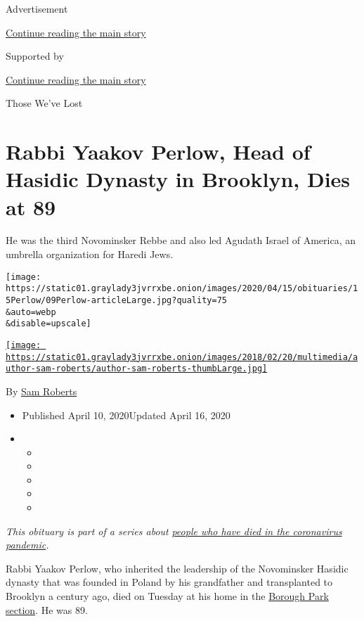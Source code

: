 Advertisement

\protect\hyperlink{after-top}{Continue reading the main story}

Supported by

\protect\hyperlink{after-sponsor}{Continue reading the main story}

Those We've Lost

\hypertarget{rabbi-yaakov-perlow-head-of-hasidic-dynasty-in-brooklyn-dies-at-89}{%
\section{Rabbi Yaakov Perlow, Head of Hasidic Dynasty in Brooklyn, Dies
at
89}\label{rabbi-yaakov-perlow-head-of-hasidic-dynasty-in-brooklyn-dies-at-89}}

He was the third Novominsker Rebbe and also led Agudath Israel of
America, an umbrella organization for Haredi Jews.

\texttt{[image: https://static01.graylady3jvrrxbe.onion/images/2020/04/15/obituaries/15Perlow/09Perlow-articleLarge.jpg?quality=75\\\&auto=webp\\\&disable=upscale]}

\href{https://www.nytimes3xbfgragh.onion/by/sam-roberts}{\texttt{[image: https://static01.graylady3jvrrxbe.onion/images/2018/02/20/multimedia/author-sam-roberts/author-sam-roberts-thumbLarge.jpg]}}

By \href{https://www.nytimes3xbfgragh.onion/by/sam-roberts}{Sam Roberts}

\begin{itemize}
\item
  Published April 10, 2020Updated April 16, 2020
\item
  \begin{itemize}
  \item
  \item
  \item
  \item
  \item
  \end{itemize}
\end{itemize}

\emph{This obituary is part of a series about}
\href{https://www.nytimes3xbfgragh.onion/series/people-who-have-died-of-the-coronavirus}{\emph{people
who have died in the coronavirus pandemic}}\emph{.}

Rabbi Yaakov Perlow, who inherited the leadership of the Novominsker
Hasidic dynasty that was founded in Poland by his grandfather and
transplanted to Brooklyn a century ago, died on Tuesday at his home in
the
\href{https://www.nytimes3xbfgragh.onion/2020/04/21/nyregion/coronavirus-jews-hasidic-ny.html}{Borough
Park section}. He was 89.


